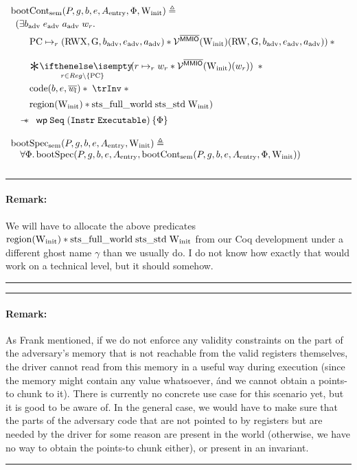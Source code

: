 \documentclass{article}
\newcommand{\X}[1]{\ensuremath{\mathrm{#1}}}
\newcommand{\V}[1]{\ensuremath{\mathit{#1}}}
\newcommand{\I}[1]{\ensuremath{\mathtt{#1}}}
\DeclareMathOperator{\driverC}{code}
\newcommand{\bigast}[2]{\underset{#1}\Sep{\!\!\! #2}\;}
\newenvironment{remark}
{ \bigskip\hrule\vspace{-1.3em}\nobreak
  \paragraph*{Remark:}}
{\vspace*{0.5em}\hrule\medskip}
\begin{document}
\[\begin{array}{l}
 \X{bootCont_{sem}}(P, g, b, e, A_{\X{entry}},\Phi,\Winit) \eqdef  \\[0.2em]
    \begin{array}{l}
       (\exists b_{\X{adv}}\; e_{\X{adv}}\; a_{\X{adv}}\; w_r.\; \\[0.5em]
      \quad
      \begin{array}{l}
        \X{PC} \mapsto_{r} (\X{RWX}, \X{G}, b_{\X{adv}}, e_{\X{adv}}, a_{\X{adv}})
        \ast \VR^{\notMMIO} (\Winit)(\X{RW}, \X{G}, b_{\X{adv}}, e_{\X{adv}}, a_{\X{adv}})) \ast {} \\[1.2em]
        \bigast{r \in Reg\setminus \{\X{PC}\}}{(r \mapsto_{r} w_r \ast
        \VR^{\notMMIO} (\Winit)(w_r))} \ast {} \\[1.2em]
        \driverC(b,e,\overline{\V{w}_l})\ast
        \; \trInv \; \ast \\[0.5em]
        \X{region}(\Winit) \ast  \X{sts\_full\_world}\; \X{sts\_std} \;
        \Winit)\\[0.5em]       \end{array}
    \end{array} \\[4em]
    \quad\wand
    \begin{array}{l}
     \wpre{\I{Seq}\; (\I{Instr}\; \I{Executable})}{\Phi}
    \end{array}\\[1.2em]

  \X{bootSpec_{sem}}(P, g, b, e, A_{\X{entry}},\Winit)
    \eqdef\\
     \quad \forall \Phi\ldotp  \X{bootSpec}(P, g, b, e, A_{\X{entry}},\X{bootCont_{sem}}(P, g, b, e, A_{\X{entry}},\Phi,\Winit))\\[0.8em]

  \end{array}
\]

\begin{remark}
  We will have to allocate the above predicates\\ $\X{region}(\Winit) \ast
  \X{sts\_full\_world}\; \X{sts\_std} \; \Winit$ from our Coq development under
  a different ghost name $\gamma$ than we usually do.
  I do not know how exactly that would work on a technical level, but it should somehow.
\end{remark}

\begin{remark}
As Frank mentioned, if we do not enforce any validity constraints on the part of the adversary's memory that is not reachable
from the valid registers themselves, the driver cannot read from this memory in
a useful way during execution (since the memory might contain any value
whatsoever, \'and we cannot obtain a points-to chunk to it).
There is currently no concrete use case for this scenario yet, but it is good to be aware of.
In the general case, we would have to make sure that the parts of the adversary
code that are not pointed to by registers but are needed by the driver for some
reason are present in the world (otherwise, we have no way to obtain the
points-to chunk either), or present in an invariant.
\end{remark}
\end{document}

